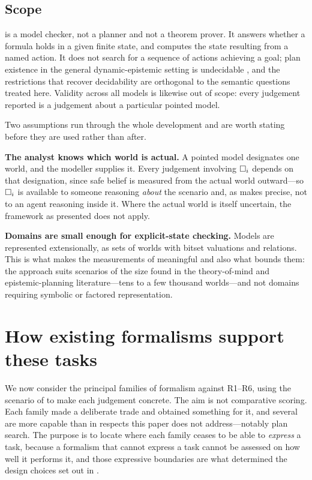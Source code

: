 \documentclass[11pt,a4paper]{article}
\begin{document}
\subsection{Scope}

\delhi{} is a model checker, not a planner and not a theorem prover. It answers whether a
formula holds in a given finite state, and computes the state resulting from a named action.
It does not search for a sequence of actions achieving a goal; plan existence in the general
dynamic-epistemic setting is undecidable \citep{bolander2011}, and the restrictions that
recover decidability are orthogonal to the semantic questions treated here. Validity across
all models is likewise out of scope: every judgement reported is a judgement about a
particular pointed model.

Two assumptions run through the whole development and are worth stating before they are used
rather than after.

\textbf{The analyst knows which world is actual.} A pointed model designates one world, and
the modeller supplies it. Every judgement involving $\Box_{i}$ depends on that designation,
since safe belief is measured from the actual world outward---so $\Box_{i}$ is available to
someone reasoning \emph{about} the scenario and, as  makes precise, not
to an agent reasoning inside it. Where the actual world is itself uncertain, the framework as
presented does not apply.

\textbf{Domains are small enough for explicit-state checking.} Models are represented
extensionally, as sets of worlds with bitset valuations and relations. This is what makes the
measurements of  meaningful and also what bounds them: the approach suits
scenarios of the size found in the theory-of-mind and epistemic-planning literature---tens to
a few thousand worlds---and not domains requiring symbolic or factored representation.



\section{How existing formalisms support these tasks}
\label{sec:motivating}

We now consider the principal families of formalism against R1--R6, using the scenario of
 to make each judgement concrete. The aim is not comparative scoring. Each
family made a deliberate trade and obtained something for it, and several are more capable than
\delhi{} in respects this paper does not address---notably plan search. The purpose is to locate
where each family ceases to be able to \emph{express} a task, because a formalism that cannot
express a task cannot be assessed on how well it performs it, and those expressive boundaries
are what determined the design choices set out in .
\end{document}
